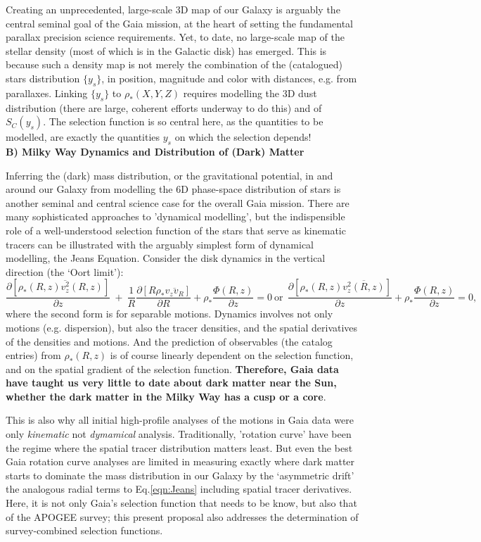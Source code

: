 Creating an unprecedented, large-scale 3D map of our Galaxy is arguably the central seminal goal of the Gaia mission, at the heart of setting the fundamental parallax precision science requirements. Yet, to date, no large-scale map of the stellar density (most of which is in the Galactic disk) has emerged. This is because 
such a density map is not merely the combination of the (catalogued) stars distribution $\{y_s\}$, in position, magnitude and color with distances, e.g. from parallaxes. Linking $\{y_s\}$ to $\rho_*(X,Y,Z)$ requires modelling the 3D dust distribution (there are large, coherent efforts underway to do this) and of $S_C(y_s)$. The selection function is so central here, as the quantities to be modelled, are exactly the quantities $y_s$ on which the selection depends!
\\

\noindent\textbf{B) Milky Way Dynamics and Distribution of (Dark) Matter}

Inferring the (dark) mass distribution, or the gravitational potential, in and around our Galaxy from modelling the 6D phase-space distribution of stars is another seminal and central science case for the overall Gaia mission. There are many sophisticated approaches to 'dynamical modelling', but the indispensible role of a well-understood selection function of the stars that serve as kinematic tracers can be illustrated with the arguably simplest form of dynamical modelling, the Jeans Equation. Consider the disk dynamics in the vertical direction (the `Oort limit'):
\begin{equation}
    \frac{\partial[\rho_*(R,z) \overline{v_z^2}(R,z)]}{\partial z}~+~\frac{1}{R}
    \frac{\partial[R \rho_* \overline{v_z v_R}]}{\partial R} + \rho_*\frac{\Phi(R,z)}{\partial z}=0 \mathrm{\ or\ \ } \frac{\partial[\rho_*(R,z) \overline{v_z^2(R,z)}]}{\partial z} + \rho_*\frac{\Phi(R,z)}{\partial z}=0,
    \label{eqn:Jeans}
\end{equation}
where the second form is for separable motions. Dynamics involves not only motions (e.g. dispersion), but also the tracer densities, and the spatial derivatives of the densities and motions. And the prediction of observables (the catalog entries) from $\rho_*(R,z)$ is of course linearly dependent on the selection function, and
on the spatial gradient of the selection function. \textbf{Therefore, Gaia data have taught us very little to date about dark matter near the Sun, whether the dark matter in the Milky Way has a cusp or a core}.

This is also why all initial high-profile analyses of the motions in Gaia data 
\citep{Katz2018a,Antoja2018a} were only \emph{kinematic} not \emph{dymamical} analysis. Traditionally, 'rotation curve' have been the regime where the spatial tracer distribution matters least. But even the best Gaia rotation curve analyses \citep[e.g.][]{Eilers2019a} are limited in measuring exactly where dark matter starts to dominate the mass distribution in our Galaxy by the `asymmetric drift' 
the analogous radial terms to Eq.\ref{eqn:Jeans} including spatial tracer derivatives. Here, it is not only Gaia's selection function that needs to be know, but also that of the APOGEE survey; this present proposal also addresses the determination of survey-combined selection functions.


